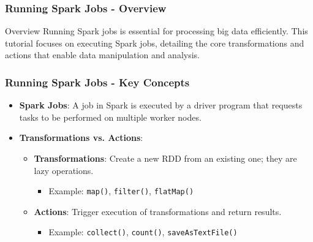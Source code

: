 \documentclass[aspectratio=169]{beamer}
\begin{document}
\begin{frame}
    \frametitle{Running Spark Jobs - Overview}
    \begin{block}{Overview}
        Running Spark jobs is essential for processing big data efficiently. This tutorial focuses on executing Spark jobs, detailing the core transformations and actions that enable data manipulation and analysis.
    \end{block}
\end{frame}

\begin{frame}
    \frametitle{Running Spark Jobs - Key Concepts}
    \begin{itemize}
        \item \textbf{Spark Jobs}: A job in Spark is executed by a driver program that requests tasks to be performed on multiple worker nodes.
        \item \textbf{Transformations vs. Actions}:
        \begin{itemize}
            \item \textbf{Transformations}: Create a new RDD from an existing one; they are lazy operations.
            \begin{itemize}
                \item Example: \texttt{map()}, \texttt{filter()}, \texttt{flatMap()}
            \end{itemize}
            \item \textbf{Actions}: Trigger execution of transformations and return results.
            \begin{itemize}
                \item Example: \texttt{collect()}, \texttt{count()}, \texttt{saveAsTextFile()}
            \end{itemize}
        \end{itemize}
    \end{itemize}
\end{frame}
\end{document}
